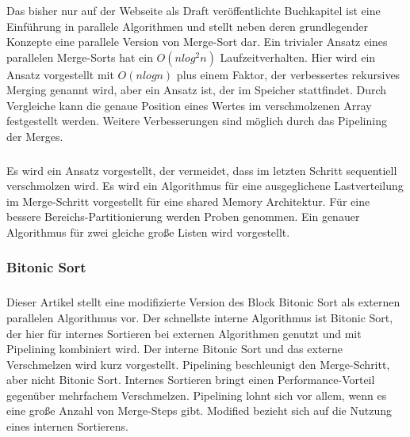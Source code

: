 \documentclass[a4paper,12pt,twoside]{article}
\begin{document}
\subsubsection*{}

Das bisher nur auf der Webseite als Draft veröffentlichte Buchkapitel ist eine Einführung in parallele Algorithmen und stellt neben deren grundlegender Konzepte eine parallele Version von Merge-Sort dar. Ein trivialer Ansatz eines parallelen Merge-Sorts hat ein $O(n log^{2} n)$ Laufzeitverhalten. Hier wird ein Ansatz vorgestellt mit $O(n log n)$ plus einem Faktor, der verbessertes rekursives Merging genannt wird, aber ein Ansatz ist, der im Speicher stattfindet. Durch Vergleiche kann die genaue Position eines Wertes im verschmolzenen Array festgestellt werden. Weitere Verbesserungen sind möglich durch das Pipelining der Merges.

\subsubsection*{}

Es wird ein Ansatz vorgestellt, der vermeidet, dass im letzten Schritt sequentiell verschmolzen wird. Es wird ein Algorithmus für eine ausgeglichene Lastverteilung im Merge-Schritt vorgestellt für eine shared Memory Architektur. Für eine bessere Bereichs-Partitionierung werden Proben genommen. Ein genauer Algorithmus für zwei gleiche große Listen wird vorgestellt. 

\subsubsection{Bitonic Sort}

\subsubsection*{}

Dieser Artikel stellt eine modifizierte Version des Block Bitonic Sort als externen parallelen Algorithmus vor. Der schnellste interne Algorithmus ist Bitonic Sort, der hier für internes Sortieren bei externen Algorithmen genutzt und mit Pipelining kombiniert wird. Der interne Bitonic Sort und das externe Verschmelzen wird kurz vorgestellt. Pipelining beschleunigt den Merge-Schritt, aber nicht Bitonic Sort. Internes Sortieren bringt einen Performance-Vorteil gegenüber mehrfachem Verschmelzen. Pipelining lohnt sich vor allem, wenn es eine große Anzahl von Merge-Steps gibt. Modified bezieht sich auf die Nutzung eines internen Sortierens. 
\end{document}
